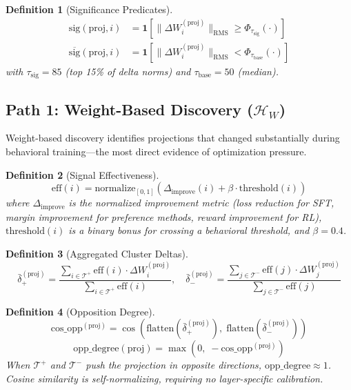 \documentclass[11pt]{article}
\newtheorem{definition}{Definition}[section]
\begin{document}
\begin{definition}[Significance Predicates]
\begin{align}
\text{sig}(\text{proj}, i) &= \mathbf{1}\left[\|\Delta W^{(\text{proj})}_i\|_{\text{RMS}} \geq \Phi_{\tau_{\text{sig}}}(\cdot)\right] \\
\overline{\text{sig}}(\text{proj}, i) &= \mathbf{1}\left[\|\Delta W^{(\text{proj})}_i\|_{\text{RMS}} < \Phi_{\tau_{\text{base}}}(\cdot)\right]
\end{align}
with $\tau_{\text{sig}} = 85$ (top 15\% of delta norms) and $\tau_{\text{base}} = 50$ (median).
\end{definition}

\subsection{Path 1: Weight-Based Discovery ($\mathcal{H}_W$)}

Weight-based discovery identifies projections that changed substantially during behavioral training---the most direct evidence of optimization pressure.

\begin{definition}[Signal Effectiveness]
\label{def:signal-effectiveness}
\begin{equation}
\text{eff}(i) = \text{normalize}_{[0,1]}\left(\Delta_{\text{improve}}(i) + \beta \cdot \text{threshold}(i)\right)
\end{equation}
where $\Delta_{\text{improve}}$ is the normalized improvement metric (loss reduction for SFT, margin improvement for preference methods, reward improvement for RL), $\text{threshold}(i)$ is a binary bonus for crossing a behavioral threshold, and $\beta = 0.4$.
\end{definition}

\begin{definition}[Aggregated Cluster Deltas]
\label{def:cluster-deltas}
\begin{equation}
\bar{\delta}^{(\text{proj})}_+ = \frac{\sum_{i \in \mathcal{T}^+} \text{eff}(i) \cdot \Delta W^{(\text{proj})}_i}{\sum_{i \in \mathcal{T}^+} \text{eff}(i)}, \quad \bar{\delta}^{(\text{proj})}_- = \frac{\sum_{j \in \mathcal{T}^-} \text{eff}(j) \cdot \Delta W^{(\text{proj})}_j}{\sum_{j \in \mathcal{T}^-} \text{eff}(j)}
\end{equation}
\end{definition}

\begin{definition}[Opposition Degree]
\label{def:opposition-degree}
\begin{equation}
\text{cos\_opp}^{(\text{proj})} = \cos\!\left(\text{flatten}(\bar{\delta}^{(\text{proj})}_+),\; \text{flatten}(\bar{\delta}^{(\text{proj})}_-)\right)
\end{equation}
\begin{equation}
\text{opp\_degree}(\text{proj}) = \max\!\left(0,\; -\text{cos\_opp}^{(\text{proj})}\right)
\end{equation}
When $\mathcal{T}^+$ and $\mathcal{T}^-$ push the projection in opposite directions, $\text{opp\_degree} \approx 1$. Cosine similarity is self-normalizing, requiring no layer-specific calibration.
\end{definition}
\end{document}
